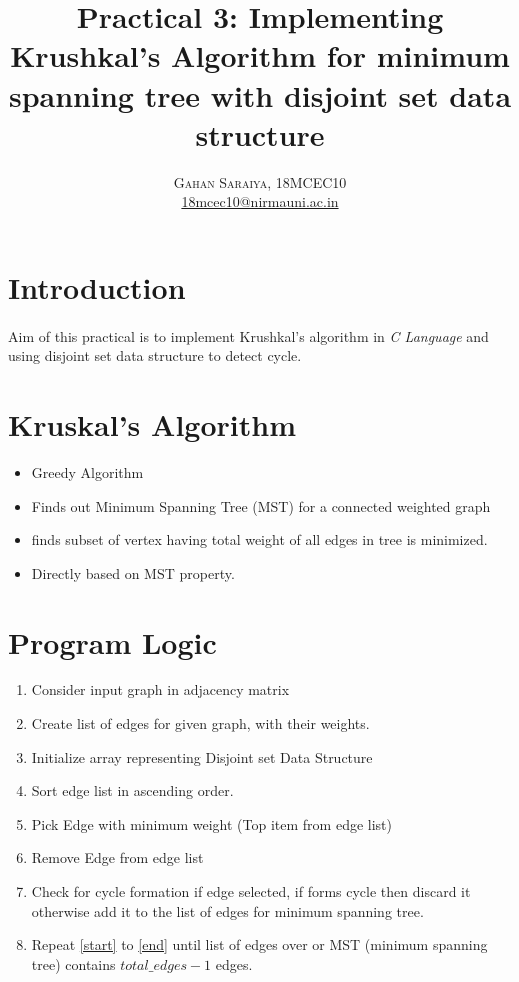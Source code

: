 \documentclass[paper=letter, fontsize=12pt]{article}
\title{\vspace{-15mm}\fontsize{24pt}{10pt}\selectfont\textbf{Practical 3: Implementing Krushkal's Algorithm for minimum spanning tree with disjoint set data structure}} %
\author{
\large
{\textsc{Gahan Saraiya, 18MCEC10 }}\\[2mm]
\normalsize \href{mailto:18mcec10@nirmauni.ac.in}{18mcec10@nirmauni.ac.in}\\[2mm] %
}
\date{}
\begin{document}
\maketitle %
\thispagestyle{fancy} %

\newcommand*\tick{\item[\Checkmark]}
\newcommand*\arrow{\item[$\Rightarrow$]}
\newcommand*\fail{\item[\XSolidBrush]}

\section{Introduction}
\paragraph{}
Aim of this practical is to implement Krushkal's algorithm in \textit{C Language} and using disjoint set data structure to detect cycle.

\section{Kruskal's Algorithm}
\begin{itemize}
	\item Greedy Algorithm
	\item Finds out Minimum Spanning Tree (MST) for a connected weighted graph
	\item finds subset of vertex having total weight of all edges in tree is minimized.
	\item Directly based on MST property.
\end{itemize}

\section{Program Logic}
\begin{enumerate}
	\item Consider input graph in adjacency matrix 
	\item Create list of edges for given graph, with their weights.
	\item Initialize array representing Disjoint set Data Structure
	\item Sort edge list in ascending order.
	\item \label{start} Pick Edge with minimum weight (Top item from edge list)
	\item Remove Edge from edge list
	\item \label{end} Check for cycle formation if edge selected, if forms cycle then discard it otherwise add it to the list of edges for minimum spanning tree.
	\item Repeat \ref{start} to \ref{end} until list of edges over or MST (minimum spanning tree) contains $ total\_edges - 1$ edges.
	
\end{enumerate}
\end{document}

